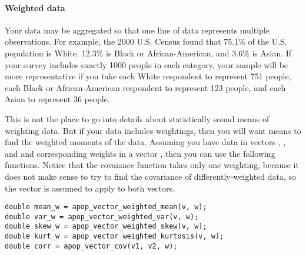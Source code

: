 

\paragraph{\treesymbol{} Weighted data} Your data may be aggregated so
that one line of data represents multiple observations. For example, the
2000 U.S. Census found that 75.1\% of the U.S. population is White,
12.3\% is Black or African-American, and 3.6\% is Asian. If your survey
includes exactly 1000 people in each category, your sample will be more
representative if you take each White respondent to represent 751
people, each Black or African-American respondent to represent 123
people, and each Asian to represent 36 people. 

This is not the place to go into details about statistically sound means
of weighting data. But if your data includes weightings, then you will
want means to find the weighted moments of the data. Assuming you have
data in vectors , , and  and corresponding weights in a vector
, then you can use the following functions. Notice that the
covaiance function takes only one weighting, because it does not make
sense to try to find the covariance of differently-weighted data, so the
 vector is assumed to apply to both vectors.
 
 
\begin{lstlisting}
double mean_w = apop_vector_weighted_mean(v, w);
double var_w = apop_vector_weighted_var(v, w);
double skew_w = apop_vector_weighted_skew(v, w);
double kurt_w = apop_vector_weighted_kurtosis(v, w);
double corr = apop_vector_cov(v1, v2, w);
\end{lstlisting}

